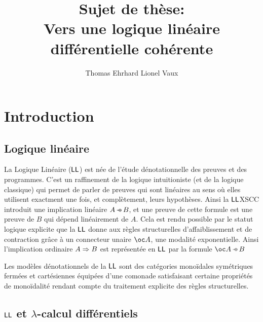 \documentclass[a4]{article}
\title{Sujet de thèse:\\
  Vers une logique linéaire différentielle cohérente}
\author{Thomas Ehrhard \hspace{5em} Lionel Vaux}
\begin{document}
\maketitle

\section*{Introduction}

\subsection*{Logique linéaire}

La Logique Linéaire ($\hbox{\textsf{LL}}$) est née de l'étude dénotationnelle des
preuves et des programmes.
%
C'est un raffinement de la logique intuitioniste (et de la logique
classique) qui permet de parler de preuves qui sont linéaires au sens
où elles utilisent exactment une fois, et complètement, leurs
hypothèses.
%
Ainsi la $\hbox{\textsf{LL}}$XSCC
introduit une implication linéaire ${A}\mathop{-\!\!\!\circ}{B}$, et une
preuve de cette formule est une preuve de $B$ qui dépend linéairement
de $A$.
%
Cela est rendu possible par le statut logique explicite que la $\hbox{\textsf{LL}}$
donne aux règles structurelles d'affaiblissement et de contraction
grâce à un connecteur unaire $\Oc A$, une modalité exponentielle.
%
Ainsi l'implication ordinaire ${A}\Rightarrow{B}$ est représentée en $\hbox{\textsf{LL}}$ par
la formule $\Limpl{\Oc A}B$

Les modèles dénotationnels de la $\hbox{\textsf{LL}}$ sont des catégories monoïdales
symétriques fermées et cartésiennes équipées d'une comonade
satisfaisant certaine propriétés de monoïdalité rendant compte du
traitement explicite des règles structurelles.

\subsection*{$\hbox{\textsf{LL}}$ et $\lambda$-calcul différentiels}
\end{document}
